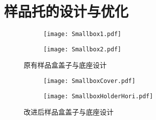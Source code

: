 


            \section{样品托的设计与优化} %
            \label{sec:样品托的设计与优化}



\begin{figure}[h]
  \centering%
  \begin{subfigure}{0.4\textwidth}
    \texttt{[image: Smallbox1.pdf]}
  \end{subfigure}%
  \hfill
  \begin{subfigure}{0.4\textwidth}
    \texttt{[image: Smallbox2.pdf]}
  \end{subfigure}
  \caption{原有样品盒盖子与底座设计}
  \label{fig:oldSampleBox}
\end{figure}
                  












\begin{figure}[h]
  \centering%
  \begin{subfigure}{0.4\textwidth}
    \texttt{[image: SmallboxCover.pdf]}
  \end{subfigure}%
  \hfill
  \begin{subfigure}{0.4\textwidth}
    \texttt{[image: SmallboxHolderHori.pdf]}
  \end{subfigure}
  \caption{改进后样品盒盖子与底座设计}
  \label{fig:newSampleBox}
\end{figure}











